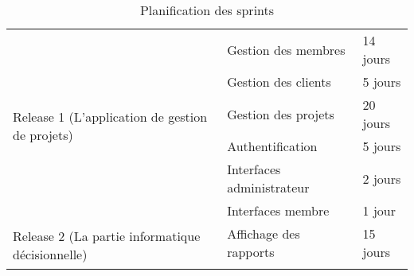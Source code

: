 \begin{table}

\begin{tabular}{|l|l|l|}
\hline
\multirow{6}{*}{Release 1 (L’application de gestion de projets)}  & Gestion des membres       & 14 jours  \\
\cline{2-3}
                                                                  & Gestion des clients       & 5 jours   \\
\cline{2-3}
                                                                  & Gestion des projets       & 20 jours  \\
\cline{2-3}
                                                                  & Authentification          & 5 jours   \\
\cline{2-3}
                                                                  & Interfaces administrateur & 2 jours   \\
\cline{2-3}
                                                                  & Interfaces membre         & 1 jour    \\
\hline
\multirow{2}{*}{Release 2 (La partie informatique décisionnelle)} & Affichage des rapports    & 15 jours  \\
\cline{2-3}
                                                                  &                           &           \\
\hline
\end{tabular}
\centering
\caption{Planification des sprints }
\end{table}